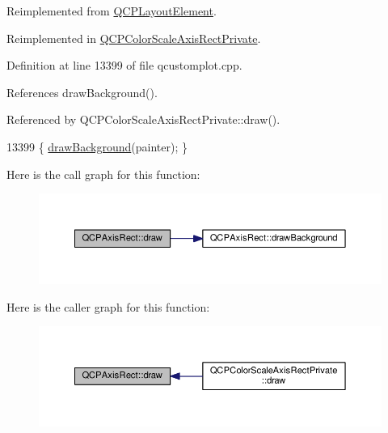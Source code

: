 Reimplemented from \hyperlink{class_q_c_p_layout_element_a547bcc1e6e2be5645ca781efe0834653}{Q\+C\+P\+Layout\+Element}.



Reimplemented in \hyperlink{class_q_c_p_color_scale_axis_rect_private_adb67bfe9057a9dd9a85f548c274e6d98}{Q\+C\+P\+Color\+Scale\+Axis\+Rect\+Private}.



Definition at line 13399 of file qcustomplot.\+cpp.



References draw\+Background().



Referenced by Q\+C\+P\+Color\+Scale\+Axis\+Rect\+Private\+::draw().


\begin{DoxyCode}
13399 \{ \hyperlink{class_q_c_p_axis_rect_ab49d338d1ce74b476fcead5b32cf06dc}{drawBackground}(painter); \}
\end{DoxyCode}


Here is the call graph for this function\+:\nopagebreak
\begin{figure}[H]
\begin{center}
\leavevmode
\includegraphics[width=350pt]{class_q_c_p_axis_rect_afb1bbbbda8345cd2710d92ee48440b53_cgraph}
\end{center}
\end{figure}




Here is the caller graph for this function\+:\nopagebreak
\begin{figure}[H]
\begin{center}
\leavevmode
\includegraphics[width=350pt]{class_q_c_p_axis_rect_afb1bbbbda8345cd2710d92ee48440b53_icgraph}
\end{center}
\end{figure}


